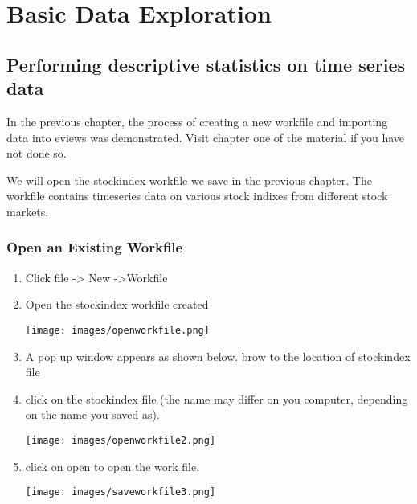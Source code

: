 \documentclass[
  letterpaper,
  DIV=11,
  numbers=noendperiod]{scrartcl}
\author{}
\date{}
\begin{document}
\ifdefined\Shaded\renewenvironment{Shaded}{\begin{tcolorbox}[breakable, interior hidden, borderline west={3pt}{0pt}{shadecolor}, frame hidden, boxrule=0pt, sharp corners, enhanced]}{\end{tcolorbox}}\fi

\hypertarget{basic-data-exploration}{%
\section{\texorpdfstring{\textbf{Basic Data
Exploration}}{Basic Data Exploration}}\label{basic-data-exploration}}

\hypertarget{performing-descriptive-statistics-on-time-series-data}{%
\subsection{Performing descriptive statistics on time series
data}\label{performing-descriptive-statistics-on-time-series-data}}

In the previous chapter, the process of creating a new workfile and
importing data into eviews was demonstrated. Visit chapter one of the
material if you have not done so.

We will open the stockindex workfile we save in the previous chapter.
The workfile contains timeseries data on various stock indixes from
different stock markets.

\hypertarget{open-an-existing-workfile}{%
\subsubsection{Open an Existing
Workfile}\label{open-an-existing-workfile}}

\begin{enumerate}
\def\labelenumi{\arabic{enumi}.}
\item
  Click file -\textgreater{} New -\textgreater Workfile
\item
  Open the stockindex workfile created

  \texttt{[image: images/openworkfile.png]}
\item
  A pop up window appears as shown below. brow to the location of
  stockindex file
\item
  click on the stockindex file (the name may differ on you computer,
  depending on the name you saved as).

  \texttt{[image: images/openworkfile2.png]}
\item
  click on open to open the work file.

  \texttt{[image: images/saveworkfile3.png]}
\end{enumerate}
\end{document}
